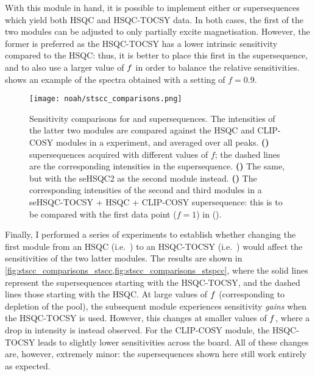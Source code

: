 With this module in hand, it is possible to implement either  or  supersequences which yield both HSQC and HSQC-TOCSY data.
In both cases, the first of the two \carbon{} modules can be adjusted to only partially excite  magnetisation.
However, the former is preferred as the HSQC-TOCSY has a lower intrinsic sensitivity compared to the HSQC: thus, it is better to place this first in the supersequence, and to also use a larger value of $f\/$ in order to balance the relative sensitivities.
 shows an example of the spectra obtained with a setting of $f = 0.9$.

\begin{figure}[!ht]
    \centering
    \texttt{[image: noah/stscc\_comparisons.png]}%
    {\label{fig:stscc_comparisons_stscc}}%
    {\label{fig:stscc_comparisons_stspcc}}%
    {\label{fig:stscc_comparisons_sehsqc_tocsy}}%
    \caption[Sensitivity comparisons for supersequences containing HSQC-TOCSY module]{
        Sensitivity comparisons for  and  supersequences.
        The intensities of the latter two modules are compared against the HSQC and CLIP-COSY modules in a  experiment, and averaged over all peaks.
        \textbf{()}  supersequences acquired with different values of $f$; the dashed lines are the corresponding intensities in the  supersequence.
        \textbf{()} The same, but with the seHSQC2 as the second module instead.
        \textbf{()} The corresponding intensities of the second and third modules in a seHSQC-TOCSY + HSQC + CLIP-COSY supersequence: this is to be compared with the first data point ($f = 1$) in ().
    }
    \label{fig:stscc_comparisons}
\end{figure}

Finally, I performed a series of experiments to establish whether changing the first module from an HSQC (i.e.\ ) to an HSQC-TOCSY (i.e.\ ) would affect the sensitivities of the two latter modules.
The results are shown in \cref{fig:stscc_comparisons_stscc,fig:stscc_comparisons_stspcc}, where the solid lines represent the supersequences starting with the HSQC-TOCSY, and the dashed lines those starting with the HSQC.
At large values of $f\/$ (corresponding to depletion of the  pool), the subsequent \carbon{} module experiences sensitivity \textit{gains} when the HSQC-TOCSY is used.
However, this changes at smaller values of $f\/$, where a drop in intensity is instead observed.
For the CLIP-COSY module, the HSQC-TOCSY leads to slightly lower sensitivities across the board.
All of these changes are, however, extremely minor: the supersequences shown here still work entirely as expected.

